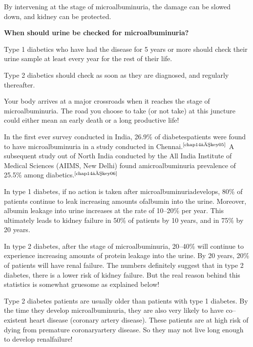 By intervening at the stage of microalbuminuria, the damage can be slowed down, and kidney can be protected.

\vskip 8pt
\noindent\textbf{When should urine be checked for microalbuminuria?}

Type 1 diabetics who have had the disease for 5 years or more should check their urine sample at least every year for the rest of their life.

Type 2 diabetics should check as soon as they are diagnosed, and regularly thereafter.

\vskip 8pt

Your body arrives at a major crossroads when it reaches the stage of microalbuminuria. The road you choose to take (or not take) at this juncture could either mean an early death or a long productive life!

In the first ever survey conducted in India, 26.9\% of diabetes\break patients were found to have microalbuminuria in a study conducted in Chennai.$^{\text{\cite{chap14–key05}}}$ A subsequent study out of North India conducted by the All India Institute of Medical Sciences (AIIMS, New Delhi) found a\break microalbuminuria prevalence of 25.5\% among diabetics.$^{\text{\cite{chap14–key06}}}$

In type 1 diabetes, if no action is taken after microalbuminuria\break develops, 80\% of patients continue to leak increasing amounts of\break albumin into the urine. Moreover, albumin leakage into urine increases at the rate of 10–20\% per year. This ultimately leads to kidney failure in 50\% of patients by 10 years, and in 75\% by 20 years.

In type 2 diabetes, after the stage of microalbuminuria, 20–40\% will continue to experience increasing amounts of protein leakage into the urine. By 20 years, 20\% of patients will have renal failure. The numbers definitely suggest that in type 2 diabetes, there is a lower risk of kidney failure. But the real reason behind this statistics is somewhat gruesome as explained below!

Type 2 diabetes patients are usually older than patients with type 1 diabetes. By the time they develop microalbuminuria, they are also very likely to have co–existent heart disease (coronary artery disease). These patients are at high risk of dying from premature coronary\break artery disease. So they may not live long enough to develop renal\break failure!

